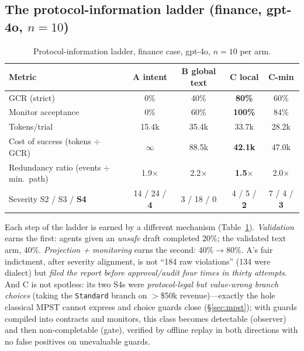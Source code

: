 \documentclass{article}
\begin{document}
\subsection{The protocol-information ladder (finance, gpt-4o, $n{=}10$)}
\begin{table}[t]
\centering\small
\caption{Protocol-information ladder, finance case, gpt-4o, $n{=}10$ per arm.}
\label{tab:ladder}
\begin{tabular}{@{}lcccc@{}}
\toprule
\textbf{Metric} & \textbf{A intent} & \textbf{B global text} & \textbf{C local} & \textbf{C-min} \\
\midrule
GCR (strict) & 0\% & 40\% & \textbf{80\%} & 60\% \\
Monitor acceptance & 0\% & 60\% & \textbf{100\%} & 84\% \\
Tokens/trial & 15.4k & 35.4k & 33.7k & 28.2k \\
Cost of success (tokens $\div$ GCR) & $\infty$ & 88.5k & \textbf{42.1k} & 47.0k \\
Redundancy ratio (events $\div$ min.\ path) & 1.9$\times$ & 2.2$\times$ & \textbf{1.5}$\times$ & 2.0$\times$ \\
\midrule
Severity S2 / S3 / \textbf{S4} & 14 / 24 / \textbf{4} & 3 / 18 / 0 & 4 / 5 / \textbf{2} & 7 / 4 / \textbf{3} \\
\bottomrule
\end{tabular}
\end{table}
Each step of the ladder is earned by a different mechanism (Table~\ref{tab:ladder}). \emph{Validation} earns the first: agents given an \emph{unsafe} draft completed 20\%; the validated text arm, 40\%. \emph{Projection + monitoring} earns the second: 40\%$\to$80\%. A's fair indictment, after severity alignment, is not ``184 raw violations'' (134 were dialect) but \emph{filed the report before approval/audit four times in thirty attempts}. And C is not spotless: its two S4s were \emph{protocol-legal but value-wrong branch choices} (taking the \texttt{Standard} branch on $>$\$50k revenue)---exactly the hole classical MPST cannot express and choice guards close (\S\ref{sec:mpst}); with guards compiled into contracts and monitors, this class becomes detectable (observer) and then non-completable (gate), verified by offline replay in both directions with no false positives on unevaluable guards.
\end{document}
